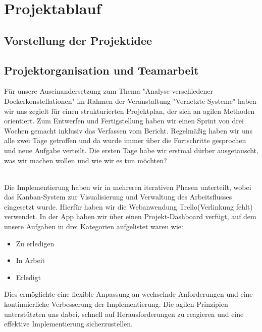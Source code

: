 \section{Projektablauf}\label{Projektablauf}

\subsection{Vorstellung der Projektidee}

\subsection{Projektorganisation und Teamarbeit}


Für unsere Auseinandersetzung zum Thema "\/Analyse verschiedener Dockerkonstellationen"\/ im Rahmen der Veranstaltung \/"Vernetzte Systeme"\/ haben wir uns zegielt für einen strukturierten Projektplan, der sich an agilen Methoden orientiert. Zum Entwerfen und Fertigstellung haben wir einen Sprint von drei Wochen gemacht inklusiv das Verfassen vom Bericht. Regelmäßig haben wir uns alle zwei Tage getroffen und da wurde immer über die Fortschritte gesprochen und neue Aufgabe verteilt. Die ersten Tage habe wir erstmal dürber ausgetauscht, was wir machen wollen und wie wir es tun möchten?

\\

Die Implementierung haben wir in mehreren iterativen Phasen unterteilt, wobei das Kanban-System zur Visualisierung und Verwaltung des Arbeitsflusses eingesetzt wurde. Hierfür haben wir die Webanwendung Trello(Verlinkung fehlt)  verwendet. In der App haben wir über einen Projekt-Dashboard verfügt, auf dem unsere Aufgaben in drei Kategorien aufgelistet waren wie:

\begin{itemize}
\item Zu erledigen
\item In Arbeit
\item Erledigt
\end{itemize}

Dies ermöglichte eine flexible Anpassung an wechselnde Anforderungen und eine kontinuierliche Verbesserung der Implementierung. Die agilen Prinzipien unterstützten uns dabei, schnell auf Herausforderungen zu reagieren und eine effektive Implementierung sicherzustellen.
